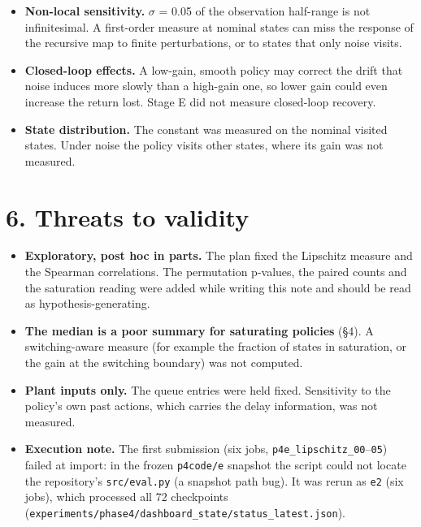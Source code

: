 \documentclass[11pt]{article}
\begin{document}
\begin{itemize}
\item \textbf{Non-local sensitivity.} $\sigma$ = 0.05 of the observation half-range is not infinitesimal. A first-order measure at nominal states can miss the response of the recursive map to finite perturbations, or to states that only noise visits.
\item \textbf{Closed-loop effects.} A low-gain, smooth policy may correct the drift that noise induces more slowly than a high-gain one, so lower gain could even increase the return lost. Stage E did not measure closed-loop recovery.
\item \textbf{State distribution.} The constant was measured on the nominal visited states. Under noise the policy visits other states, where its gain was not measured.
\end{itemize}



\section*{6. Threats to validity}



\begin{itemize}
\item \textbf{Exploratory, post hoc in parts.} The plan fixed the Lipschitz measure and the Spearman correlations. The permutation p-values, the paired counts and the saturation reading were added while writing this note and should be read as hypothesis-generating.
\item \textbf{The median is a poor summary for saturating policies} (\S{}4). A switching-aware measure (for example the fraction of states in saturation, or the gain at the switching boundary) was not computed.
\item \textbf{Plant inputs only.} The queue entries were held fixed. Sensitivity to the policy's own past actions, which carries the delay information, was not measured.
\item \textbf{Execution note.} The first submission (six jobs, \texttt{p4e\_\allowbreak{}lipschitz\_\allowbreak{}00}--\texttt{05}) failed at import: in the frozen \texttt{p4code/e} snapshot the script could not locate the repository's \texttt{src/eval.py} (a snapshot path bug). It was rerun as \texttt{e2} (six jobs), which processed all 72 checkpoints (\texttt{experiments/\allowbreak{}phase4/\allowbreak{}dashboard\_\allowbreak{}state/\allowbreak{}status\_\allowbreak{}latest.\allowbreak{}json}).
\end{itemize}
\end{document}
